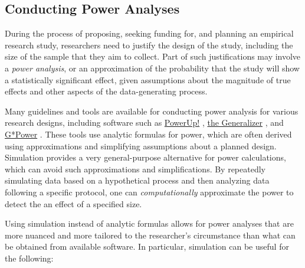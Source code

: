 \documentclass[
]{book}
\begin{document}
\subsection{Conducting Power Analyses}\label{conducting-power-analyses}

During the process of proposing, seeking funding for, and planning an empirical research study, researchers need to justify the design of the study, including the size of the sample that they aim to collect.
Part of such justifications may involve a \emph{power analysis}, or an approximation of the probability that the study will show a statistically significant effect, given assumptions about the magnitude of true effects and other aspects of the data-generating process.

Many guidelines and tools are available for conducting power analysis for various research designs, including software such as \href{https://www.causalevaluation.org/power-analysis.html}{PowerUp!} \citep{dong2013PowerUpToolCalculating}, \href{https://www.thegeneralizer.org/}{the Generalizer} \citep{tipton2014stratified}, and \href{https://www.psychologie.hhu.de/arbeitsgruppen/allgemeine-psychologie-und-arbeitspsychologie/gpower}{G*Power} \citep{faul2009StatisticalPowerAnalyses}.
These tools use analytic formulas for power, which are often derived using approximations and simplifying assumptions about a planned design. Simulation provides a very general-purpose alternative for power calculations, which can avoid such approximations and simplifications.
By repeatedly simulating data based on a hypothetical process and then analyzing data following a specific protocol, one can \emph{computationally} approximate the power to detect the an effect of a specified size.

Using simulation instead of analytic formulas allows for power analyses that are more nuanced and more tailored to the researcher's circumstance than what can be obtained from available software. In particular, simulation can be useful for the following:
\end{document}
